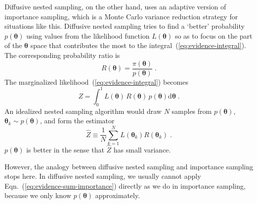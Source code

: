 \documentclass[letterpaper, preprint]{aastex}
\newcommand{\bth} {\boldsymbol \theta}
\newcommand{\md}{\mathrm{d}}
\begin{document}
Diffusive nested sampling, on the other hand, uses an adaptive version of importance sampling, which is a Monte Carlo variance reduction strategy for situations like this. Diffusive nested sampling tries to find a `better' probability $p(\bth)$ using values from the likelihood function $L(\bth)$ so as to focus on the part of the $\bth$ space that contributes the most to the integral~(\ref{eq:evidence-integral}). The corresponding probability ratio is
\begin{equation}
R(\bth) = \frac{\pi(\bth)}{p(\bth)}\; .
\end{equation}
The marginalized likelihood~(\ref{eq:evidence-integral}) becomes
\begin{equation}
Z=\int^1_0\! L(\bth)\,R(\bth)\,p(\bth)\md\bth \;.
\label{eq:evidence-integral-importance}
\end{equation}
An idealized nested sampling algorithm would draw $N$ samples from $p(\bth)$, $\bth_k \sim p(\bth)$, and form the estimator
\begin{equation}
\widehat{Z} \equiv \frac{1}{N}\sum_{k=1}^N L(\bth_k)R(\bth_k)\;.
\label{eq:evidence-sum-importance}
\end{equation}
$p(\bth)$ is better in the sense that $\widehat{Z}$ has small variance. 

However, the analogy between diffusive nested sampling and importance sampling stops here. In diffusive nested sampling, we usually cannot apply Eqn.~(\ref{eq:evidence-sum-importance}) directly as we do in importance sampling, because we only know $p(\bth)$ approximately.
\end{document}
